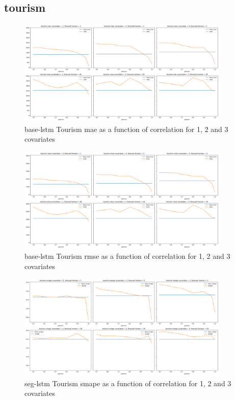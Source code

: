 \documentclass{article}
\begin{document}
\subsection{tourism}
\begin{figure}[htb]
  \centering
  \includegraphics[width=0.9\textwidth]{figures/tourism-base-lstm-mae.png}
  \caption{base-lstm Tourism mae as a function of correlation for 1, 2 and 3 covariates}
  \label{fig:base_lstm_tourism_mae}
  \end{figure}
  
  \begin{figure}[ht]
  \centering
  \includegraphics[width=0.9\textwidth]{figures/tourism-base-lstm-rmse.png}
  \caption{base-lstm Tourism rmse as a function of correlation for 1, 2 and 3 covariates}
  \label{fig:base_lstm_tourism_rmse}
  \end{figure}

  \begin{figure}[ht]
  \centering
  \includegraphics[width=0.9\textwidth]{figures/tourism-seg-lstm-smape.png}
  \caption{seg-lstm Tourism smape as a function of correlation for 1, 2 and 3 covariates}
  \label{fig:seg_lstm_tourism_smape}
  \end{figure}
  
\end{document}
